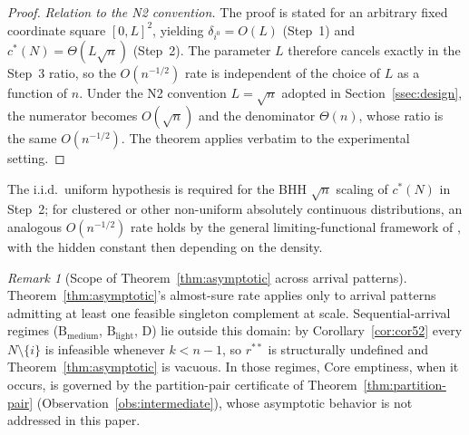 \documentclass[11pt]{article}
\theoremstyle{plain}
\theoremstyle{definition}
\theoremstyle{remark}
\newtheorem{remark}[theorem]{Remark}
\newcommand{\cstar}{c^{\ast}}
\begin{document}
\begin{proof}
\emph{Relation to the N2 convention.} The proof is stated for an arbitrary fixed coordinate square $[0,L]^2$, yielding $\delta_{i^{0}}=O(L)$ (Step~1) and $\cstar(N)=\Theta(L\sqrt{n})$ (Step~2). The parameter $L$ therefore cancels exactly in the Step~3 ratio, so the $O(n^{-1/2})$ rate is independent of the choice of $L$ as a function of $n$. Under the N2 convention $L=\sqrt{n}$ adopted in Section~\ref{ssec:design}, the numerator becomes $O(\sqrt{n})$ and the denominator $\Theta(n)$, whose ratio is the same $O(n^{-1/2})$. The theorem applies verbatim to the experimental setting.
\end{proof}

\noindent The i.i.d.\ uniform hypothesis is required for the BHH $\sqrt{n}$ scaling of $\cstar(N)$ in Step~2; for clustered or other non-uniform absolutely continuous distributions, an analogous $O(n^{-1/2})$ rate holds by the general limiting-functional framework of \citet{steele1997probability}, with the hidden constant then depending on the density.

\begin{remark}[Scope of Theorem~\ref{thm:asymptotic} across arrival patterns]
\label{rem:asymptotic-scope}
Theorem~\ref{thm:asymptotic}'s almost-sure rate applies only to arrival patterns admitting at least one feasible singleton complement at scale. Sequential-arrival regimes ($\text{B}_{\text{medium}}$, $\text{B}_{\text{light}}$, D) lie outside this domain: by Corollary~\ref{cor:cor52} every $N\setminus\{i\}$ is infeasible whenever $k<n-1$, so $r^{\ast\ast}$ is structurally undefined and Theorem~\ref{thm:asymptotic} is vacuous. In those regimes, Core emptiness, when it occurs, is governed by the partition-pair certificate of Theorem~\ref{thm:partition-pair} (Observation~\ref{obs:intermediate}), whose asymptotic behavior is not addressed in this paper.
\end{remark}
\end{document}
